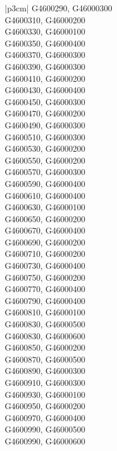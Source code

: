 \begin{customLongTable}{ |p{3cm}| }
G4600290, G46000300 \\ \hline
G4600310, G46000200 \\ \hline
G4600330, G46000100 \\ \hline
G4600350, G46000400 \\ \hline
G4600370, G46000300 \\ \hline
G4600390, G46000300 \\ \hline
G4600410, G46000200 \\ \hline
G4600430, G46000400 \\ \hline
G4600450, G46000300 \\ \hline
G4600470, G46000200 \\ \hline
G4600490, G46000300 \\ \hline
G4600510, G46000300 \\ \hline
G4600530, G46000200 \\ \hline
G4600550, G46000200 \\ \hline
G4600570, G46000300 \\ \hline
G4600590, G46000400 \\ \hline
G4600610, G46000400 \\ \hline
G4600630, G46000100 \\ \hline
G4600650, G46000200 \\ \hline
G4600670, G46000400 \\ \hline
G4600690, G46000200 \\ \hline
G4600710, G46000200 \\ \hline
G4600730, G46000400 \\ \hline
G4600750, G46000200 \\ \hline
G4600770, G46000400 \\ \hline
G4600790, G46000400 \\ \hline
G4600810, G46000100 \\ \hline
G4600830, G46000500 \\ \hline
G4600830, G46000600 \\ \hline
G4600850, G46000200 \\ \hline
G4600870, G46000500 \\ \hline
G4600890, G46000300 \\ \hline
G4600910, G46000300 \\ \hline
G4600930, G46000100 \\ \hline
G4600950, G46000200 \\ \hline
G4600970, G46000400 \\ \hline
G4600990, G46000500 \\ \hline
G4600990, G46000600 \\ \hline

\end{customLongTable}
